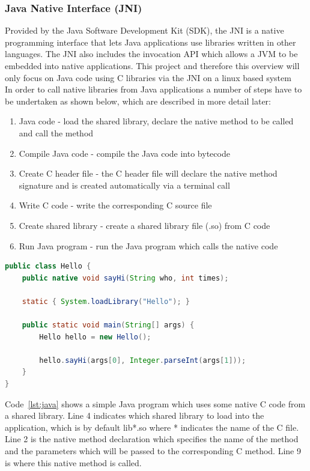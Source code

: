 \documentclass[a4paper, titlepage]{article}
\begin{document}
\subsubsection{Java Native Interface (JNI)}
Provided by the Java Software Development Kit (SDK), the JNI is a native programming interface that lets Java applications use libraries written in other languages. The JNI also includes the invocation API which allows a JVM to be embedded into native applications. This project and therefore this overview will only focus on Java code using C libraries via the JNI on a linux based system\\
\newline
In order to call native libraries from Java applications a number of steps have to be undertaken as shown below, which are described in more detail later:
\begin{enumerate}
	\item Java code - load the shared library, declare the native method to be called and call the method
	\item Compile Java code - compile the Java code into bytecode
	\item Create C header file - the C header file will declare the native method signature and is created automatically via a terminal call
	\item Write C code - write the corresponding C source file
	\item Create shared library - create a shared library file (.so) from C code
	\item Run Java program - run the Java program which calls the native code
\end{enumerate}

\begin{lstlisting}[language=Java, caption={Basic Java class showing native method declaration and calling with shared library loading}, label=lst:java]
public class Hello {
    public native void sayHi(String who, int times);

    static { System.loadLibrary("Hello"); }

    public static void main(String[] args) {
        Hello hello = new Hello();
        
        hello.sayHi(args[0], Integer.parseInt(args[1]));
    }
}
\end{lstlisting}

Code~\ref{lst:java} shows a simple Java program which uses some native C code from a shared library. Line 4 indicates which shared library to load into the application, which is by default lib*.so where * indicates the name of the C file. Line 2 is the native method declaration which specifies the name of the method and the parameters which will be passed to the corresponding C method. Line 9 is where this native method is called.
\end{document}
